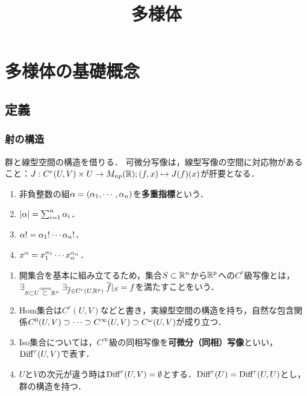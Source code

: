 \documentclass[uplatex,dvipdfmx]{jsreport}
\title{多様体}
\author{}
\begin{document}
\tableofcontents

\chapter{多様体の基礎概念}

\section{定義}

\subsection{射の構造}

\begin{tcolorbox}[colframe=ForestGreen, colback=ForestGreen!10!white,breakable,colbacktitle=ForestGreen!40!white,coltitle=black,fonttitle=\bfseries\sffamily,
title=]
    群と線型空間の構造を借りる．
    可微分写像は，線型写像の空間に対応物があること：$J:C^r(U,V)\times U\to M_{np}(\mathbb{R});(f,x)\mapsto J(f)(x)$が肝要となる．
\end{tcolorbox}

\begin{notation}[多重指標の空間]\mbox{}
    \begin{enumerate}
        \item 非負整数の組$\alpha=(\alpha_1,\cdots,\alpha_n)$を\textbf{多重指標}という．
        \item $\lvert\alpha\rvert=\sum_{i=1}^n\alpha_i$．
        \item $\alpha!=\alpha_1!\cdots\alpha_n!$．
        \item $x^\alpha=x_1^{\alpha_1}\cdots x_n^{\alpha_n}$．
    \end{enumerate}
\end{notation}

\begin{definition}[Euclid空間の射]\mbox{}
    \begin{enumerate}
        \item 開集合を基本に組み立てるため，集合$S\subset\mathbb{R}^n$から$\mathbb{R}^p$への$C^r$級写像とは，$\exists_{S\subset U\overset{\mathrm{open}}{\subset}\mathbb{R}^n}\;\exists_{\overline{f}\in C^r(U,\mathbb{R}^p)}\;\overline{f}|_S=f$を満たすことをいう．
        \item Hom集合は$C^r(U,V)$などと書き，実線型空間の構造を持ち，自然な包含関係$C^0(U,V)\supset\cdots\supset C^\infty(U,V)\supset C^\omega(U,V)$が成り立つ．
        \item Iso集合については，$C^\infty$級の同相写像を\textbf{可微分（同相）写像}といい，$\mathrm{Diff}^r(U,V)$で表す．
        \item $U$と$V$の次元が違う時は$\mathrm{Diff}^r(U,V)=\emptyset$とする．$\mathrm{Diff}^r(U)=\mathrm{Diff}^r(U,U)$とし，群の構造を持つ．
    \end{enumerate}
\end{definition}
\end{document}
